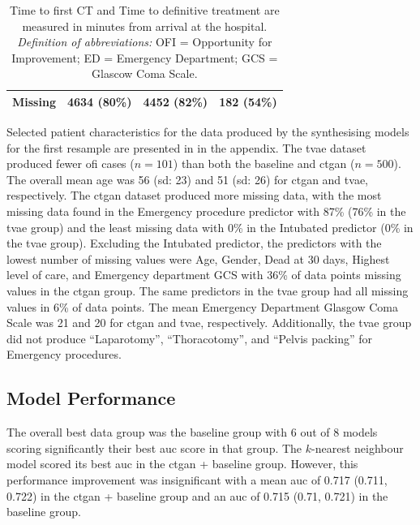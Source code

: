 \documentclass[12pt, a4paper]{article}
\begin{document}
\begin{table}[p]
{\begin{tabular}{lccc}
			\hspace{3mm}Missing                           & 4634 (80\%)       & 4452 (82\%)       & 182 (54\%)       \\
			\bottomrule
		\end{tabular}
	}
	\caption*{\small Time to first CT and Time to definitive treatment are measured in minutes from arrival at the hospital.\\
		\textit{Definition of abbreviations:} OFI = Opportunity for Improvement; ED = Emergency Department; GCS = Glascow Coma Scale.}
\end{table}

Selected patient characteristics for the data produced by the synthesising models for the first resample are presented
in  in the appendix. The \acrshort{tvae} dataset produced fewer \acrshort{ofi}
cases ($n=101$) than both the baseline and \acrshort{ctgan} ($n=500$). The overall mean age was 56 (\acrshort{sd}: 23)
and 51 (\acrshort{sd}: 26) for \acrshort{ctgan} and \acrshort{tvae}, respectively. The \acrshort{ctgan} dataset
produced more missing data, with the most missing data found in the Emergency procedure predictor with 87\% (76\% in
the \acrshort{tvae} group) and the least missing data with 0\% in the Intubated predictor (0\% in the \acrshort{tvae}
group). Excluding the Intubated predictor, the predictors with the lowest number of missing values were Age, Gender,
Dead at 30 days, Highest level of care, and Emergency department GCS with 36\% of data points missing values in the
\acrshort{ctgan} group. The same predictors in the \acrshort{tvae} group had all missing values in 6\% of data points.
The mean Emergency Department Glasgow Coma Scale was 21 and 20 for \acrshort{ctgan} and \acrshort{tvae}, respectively.
Additionally, the \acrshort{tvae} group did not produce ``Laparotomy'', ``Thoracotomy'', and ``Pelvis packing'' for
Emergency procedures.

\subsection{Model Performance}
The overall best data group was the baseline group with 6 out of 8 models scoring significantly their best
\acrshort{auc} score in that group. The $k$-nearest neighbour model scored its best \acrshort{auc} in the
\acrshort{ctgan} + baseline group. However, this performance improvement was insignificant with a mean \acrshort{auc}
of 0.717 (0.711, 0.722) in the \acrshort{ctgan} + baseline group and an \acrshort{auc} of 0.715 (0.71, 0.721) in the
baseline group.
\end{document}
